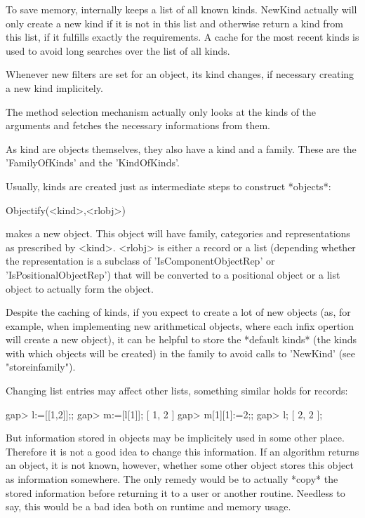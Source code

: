 \danger
To save memory,
{\GAP} internally keeps a list of all known kinds. NewKind actually will
only create a new kind if it is not in this list and otherwise return a
kind from
this list, if it fulfills exactly the requirements. A cache for the most
recent kinds is used to avoid long searches over the list of all kinds.

Whenever new filters are set for an object, its kind changes, if necessary
creating a new kind implicitely.

The method selection mechanism actually only looks at the kinds of the
arguments and fetches the necessary informations from them.

\danger
As kind are objects themselves, they also have a kind and a family.
These are the 'FamilyOfKinds' and the 'KindOfKinds'.

Usually, kinds are created just as intermediate steps to construct *objects*:

\>Objectify(<kind>,<rlobj>)

makes a new object. This object will have family, categories and
representations as prescribed by <kind>.
<rlobj> is either a record or a list (depending whether the representation
is a subclass of 'IsComponentObjectRep' or 'IsPositionalObjectRep') that
will be converted to a positional object or a list object to actually form
the object.

\danger
Despite the caching of kinds, if you expect to create a lot of
new objects (as, for example, when implementing new arithmetical objects,
where each infix opertion will create a new object), it can be helpful to
store the *default kinds* (the kinds with which objects will be
created) in the family to avoid calls to 'NewKind' (see "storeinfamily").


Changing list entries may affect other lists, something similar holds for
records:

\beginexample
gap> l:=[[1,2]];;
gap> m:=[l[1]];
[ 1, 2 ]
gap> m[1][1]:=2;;
gap> l;
[ 2, 2 ];
\endexample

But information stored in objects may be implicitely used in some other place.
Therefore it is not a good idea to change this information. If an algorithm
returns an object, it is not known, however, whether some other object
stores this object as information somewhere. The only remedy would
be to actually *copy* the stored information before returning it to a user
or another routine. Needless to say, this would be a bad idea both on
runtime and memory usage.

